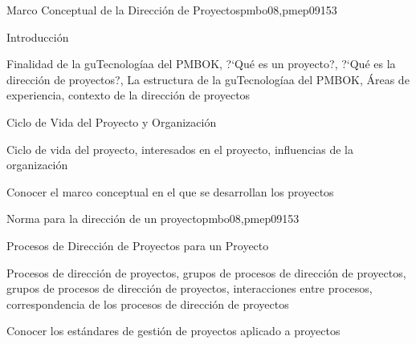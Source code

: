 \begin{syllabus}
\begin{outcomes}
\end{outcomes}

\begin{unit}{Marco Conceptual de la Dirección de Proyectos}{pmbo08,pmep09}{15}{3}
\begin{topics}
      \item Introducción
       \item Finalidad de la guTecnologíaa del PMBOK, ?`Qué es un proyecto?, ?`Qué es la dirección de proyectos?, La estructura de la guTecnologíaa del PMBOK, Áreas de experiencia, contexto de la dirección de proyectos
      \item Ciclo de Vida del Proyecto y Organización
       \item Ciclo de vida del proyecto, interesados en el proyecto, influencias de la organización
   \end{topics}

   \begin{unitgoals}
      \item Conocer el marco conceptual en el que se desarrollan los proyectos
   \end{unitgoals}
\end{unit}

\begin{unit}{Norma para la dirección de un proyecto}{pmbo08,pmep09}{15}{3}
\begin{topics}
      \item Procesos de Dirección de Proyectos para un Proyecto
       \item Procesos de dirección de proyectos, grupos de procesos de dirección de proyectos, grupos de procesos de dirección de proyectos, interacciones entre procesos, correspondencia de los procesos de dirección de proyectos
   \end{topics}

   \begin{unitgoals}
      \item Conocer los estándares de gestión de proyectos aplicado a proyectos
   \end{unitgoals}
\end{unit}


\end{syllabus}
